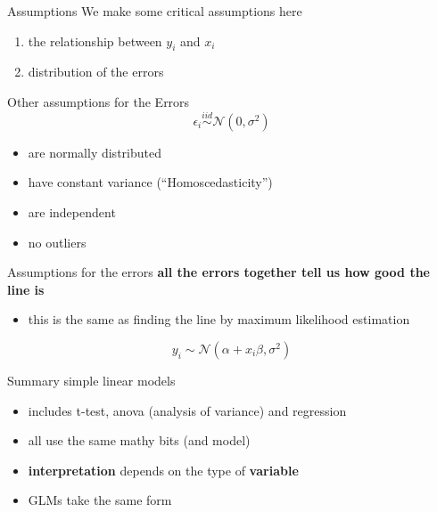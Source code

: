 \documentclass[
  ignorenonframetext,
]{beamer}
\providecommand{\tightlist}{%
  \setlength{\itemsep}{0pt}\setlength{\parskip}{0pt}}
\begin{document}
\begin{frame}{Assumptions}
\label{assumptions}
We make some critical assumptions here

\begin{enumerate}
[1)]
\tightlist
\item
  the relationship between \(y_i\) and \(x_i\)
\item
  distribution of the errors
\end{enumerate}
\end{frame}

\begin{frame}{Other assumptions for the Errors}
\label{other-assumptions-for-the-errors}
\begin{equation}
\epsilon_i \overset{iid}{\sim} \mathcal{N}(0, \sigma^2)
\end{equation}

\begin{itemize}
\tightlist
\item
  are normally distributed
\item
  have constant variance (``Homoscedasticity'')
\item
  are independent
\item
  no outliers
\end{itemize}
\end{frame}

\begin{frame}{Assumptions for the errors}
\label{assumptions-for-the-errors}
\textbf{all the errors together tell us how good the line is}

\begin{itemize}
\tightlist
\item
  this is the same as finding the line by maximum likelihood estimation
\end{itemize}

\begin{equation}
y_i \sim \mathcal{N}(\alpha+x_i\beta, \sigma^2)
\end{equation}
\end{frame}

\begin{frame}{Summary simple linear models}
\label{summary-simple-linear-models}
\begin{itemize}
\tightlist
\item
  includes t-test, anova (analysis of variance) and regression
\item
  all use the same mathy bits (and model)
\item
  \textbf{interpretation} depends on the type of \textbf{variable}
\item
  GLMs take the same form
\end{itemize}
\end{frame}
\end{document}
